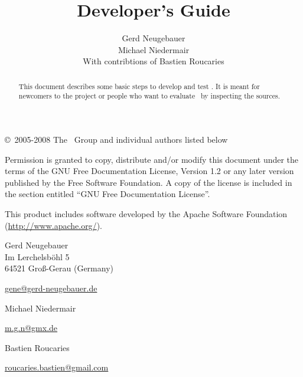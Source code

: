 \documentclass{extex-doc}
\begin{document}

\begin{titlepage}\parindent=0pt

  \title{Developer's Guide}
  \author{Gerd Neugebauer\\[2ex]%
    Michael Niedermair\\[2ex]%
    With contribtions of Bastien Roucaries}
  \maketitle

  \begin{center}
    \begin{abstract}\parindent=0pt
      This document describes some basic steps to develop and test
      \ExTeX.  It is meant for newcomers to the project or people who
      want to evaluate \ExTeX\ by inspecting the sources.
    \end{abstract}
  \end{center}
  \newpage
  \footnotesize
  \copyright\ 2005-2008 The \ExTeX\ Group and individual authors listed below
  \medskip

Permission is granted to copy, distribute and/or modify this document
under the terms of the GNU Free Documentation License, Version 1.2 or
any later version published by the Free Software Foundation. A copy of
the license is included in the section entitled ``GNU Free
Documentation License''.
\bigskip

This product includes software developed by the Apache Software
Foundation (\url{http://www.apache.org/}).

\vfill

Gerd Neugebauer\\
Im Lerchelsb\"ohl 5\\
64521 Gro\ss-Gerau (Germany)
\smallskip\par
\href{mailto://gene@gerd-neugebauer.de}{gene@gerd-neugebauer.de}
\bigskip

Michael Niedermair
\smallskip\par
\href{mailto://m.g.n@gmx.de}{m.g.n@gmx.de}
\bigskip

Bastien Roucaries
\smallskip\par
\href{mailto://roucaries.bastien@gmail.com}{roucaries.bastien@gmail.com}

\end{titlepage}

\tableofcontents
\newpage
\end{document}
